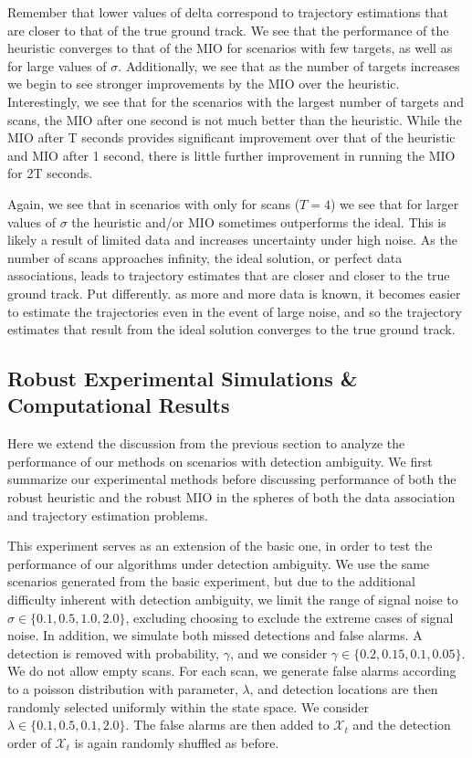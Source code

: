 \documentclass[journal]{IEEEtran}
\begin{document}
Remember that lower values of delta correspond to trajectory estimations that are closer to that of the true ground track. We see that the performance of the heuristic converges to that of the MIO for scenarios with few targets, as well as for large values of $\sigma$. Additionally, we see that as the number of targets increases we begin to see stronger improvements by the MIO over the heuristic. Interestingly, we see that for the scenarios with the largest number of targets and scans, the MIO after one second is not much better than the heuristic. While the MIO after T seconds provides significant improvement over that of the heuristic and MIO after 1 second, there is little further improvement in running the MIO for 2T seconds. 

Again, we see that in scenarios with only for scans ($T=4$) we see that for larger values of $\sigma$ the heuristic and/or MIO sometimes outperforms the ideal. This is likely a result of limited data and increases uncertainty under high noise. As the number of scans approaches infinity, the ideal solution, or perfect data associations, leads to trajectory estimates that are closer and closer to the true ground track. Put differently. as more and more data is known, it becomes easier to estimate the trajectories even in the event of large noise, and so the trajectory estimates that result from the ideal solution converges to the true ground track. 

\subsection{Robust Experimental Simulations \& Computational Results}\label{sec:Robust_Results}
Here we extend the discussion from the previous section to analyze the performance of our methods on scenarios with detection ambiguity. We first summarize our experimental methods before discussing performance of both the robust heuristic and the robust MIO in the spheres of both the data association and trajectory estimation problems.

This experiment serves as an extension of the basic one, in order to test the performance of our algorithms under detection ambiguity. We use the same scenarios generated from the basic experiment, but due to the additional difficulty inherent with detection ambiguity, we limit the range of signal noise to $\sigma \in \{0.1,0.5,1.0,2.0\}$, excluding choosing to exclude the extreme cases of signal noise. In addition, we simulate both missed detections and false alarms. A detection is removed with probability, $\gamma$, and we consider $\gamma \in \{0.2,0.15,0.1,0.05\}$. We do not allow empty scans. For each scan, we generate false alarms according to a poisson distribution with parameter, $\lambda$, and detection locations are then randomly selected uniformly within the state space. We consider $\lambda \in \{0.1,0.5,0.1,2.0\}$. The false alarms are then added to $\mathcal{X}_{t}$ and the detection order of $\mathcal{X}_{t}$ is again randomly shuffled as before. 
\end{document}
